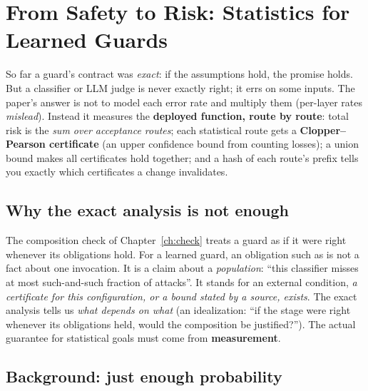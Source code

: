 \section{From Safety to Risk: Statistics for Learned Guards}
\label{ch:risk}

\begin{bigidea}
So far a guard's contract was \emph{exact}: if the assumptions hold, the promise holds. But a classifier or LLM judge is never exactly right; it errs on some inputs. The paper's answer is not to model each error rate and multiply them (per-layer rates \emph{mislead}). Instead it measures the \textbf{deployed function, route by route}: total risk is the \emph{sum over acceptance routes}; each statistical route gets a \textbf{Clopper--Pearson certificate} (an upper confidence bound from counting losses); a union bound makes all certificates hold together; and a hash of each route's prefix tells you exactly which certificates a change invalidates.
\end{bigidea}

\subsection{Why the exact analysis is not enough}

The composition check of Chapter~\ref{ch:check} treats a guard as if it were right whenever its obligations hold. For a learned guard, an obligation such as  is not a fact about one invocation. It is a claim about a \emph{population}: ``this classifier misses at most such-and-such fraction of attacks''. It stands for an external condition, \emph{a certificate for this configuration, or a bound stated by a source, exists}. The exact analysis tells us \emph{what depends on what} (an idealization: ``if the stage were right whenever its obligations held, would the composition be justified?''). The actual guarantee for statistical goals must come from \textbf{measurement}.

\subsection{Background: just enough probability}

